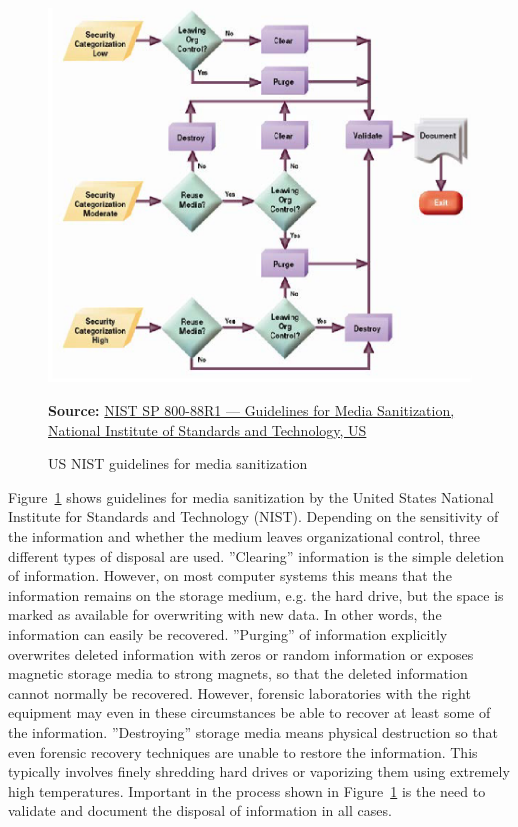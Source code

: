 \begin{figure}[b]
\centering
\includegraphics[width=.75\textwidth]{screen1.png} \\ 

\vspace{\baselineskip}

\tiny \textbf{Source:} \href{https://nvlpubs.nist.gov/nistpubs/SpecialPublications/NIST.SP.800-88r1.pdf}{NIST SP 800-88R1 --- Guidelines for Media Sanitization, National Institute of Standards and Technology, US}
\caption{US NIST guidelines for media sanitization}
\label{fig:nist}
\end{figure}

Figure~\ref{fig:nist} shows guidelines for media sanitization by the United States National Institute for Standards and Technology (NIST). Depending on the sensitivity of the information and whether the medium leaves organizational control, three different types of disposal are used. ''Clearing'' information is the simple deletion of information. However, on most computer systems this means that the information remains on the storage medium, e.g. the hard drive, but the space is marked as available for overwriting with new data. In other words, the information can easily be recovered. ''Purging'' of information explicitly overwrites deleted information with zeros or random information or exposes magnetic storage media to strong magnets, so that the deleted information cannot normally be recovered. However, forensic laboratories with the right equipment may even in these circumstances be able to recover at least some of the information. ''Destroying'' storage media means physical destruction so that even forensic recovery techniques are unable to restore the information. This typically involves finely shredding hard drives or vaporizing them using extremely high temperatures. Important in the process shown in Figure~\ref{fig:nist} is the need to validate and document the disposal of information in all cases. 

